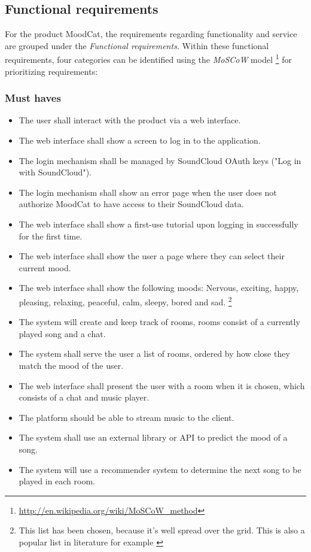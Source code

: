 
\subsection{Functional requirements}
For the product MoodCat, the requirements regarding functionality and service are grouped under the \emph{Functional requirements}.
Within these functional requirements, four categories can be identified using the \emph{MoSCoW} model \footnote{\url{http://en.wikipedia.org/wiki/MoSCoW_method}} for prioritizing requirements:

\subsubsection{Must haves}
\begin{itemize}
\item The user shall interact with the product via a web interface.

\item The web interface shall show a screen to log in to the application.

\item The login mechanism shall be managed by SoundCloud OAuth keys ("Log in with SoundCloud").

\item The login mechanism shall show an error page when the user does not authorize MoodCat to have access to their SoundCloud data.

\item The web interface shall show a first-use tutorial upon logging in successfully for the first time.

\item The web interface shall show the user a page where they can select their current mood.

\item The web interface shall show the following moods:
 Nervous, exciting, happy, pleasing, relaxing, peaceful, calm, sleepy, bored and sad. \footnote{This list has been chosen, because it's well spread over the grid. This is also a popular list in literature for example \cite{Book}}

\item The system will create and keep track of rooms, rooms consist of a currently played song and a chat.

\item The system shall serve the user a list of rooms, ordered by how close they match the mood of the user.

\item The web interface shall present the user with a room when it is chosen, which consists of a chat and music player.
	
\item The platform should be able to stream music to the client.

\item The system shall use an external library or API to predict the mood of a song.

\item The system will use a recommender system to determine the next song to be played in each room.

\end{itemize}
